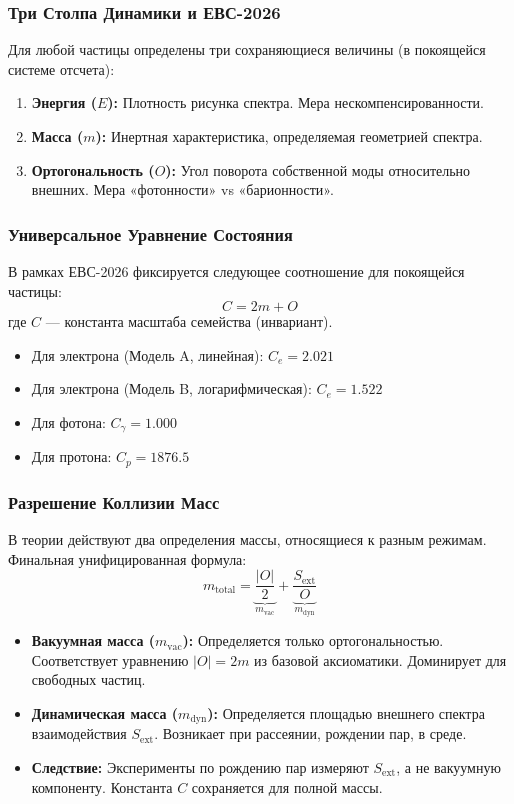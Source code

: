 \documentclass[12pt,a4paper]{article}
\begin{document}
\subsubsection{Три Столпа Динамики и ЕВС-2026}
Для любой частицы определены три сохраняющиеся величины (в покоящейся системе отсчета):
\begin{enumerate}
    \item \textbf{Энергия ($E$):} Плотность рисунка спектра. Мера нескомпенсированности.
    \item \textbf{Масса ($m$):} Инертная характеристика, определяемая геометрией спектра.
    \item \textbf{Ортогональность ($O$):} Угол поворота собственной моды относительно внешних. Мера «фотонности» vs «барионности».
\end{enumerate}

\subsubsection{Универсальное Уравнение Состояния}
В рамках ЕВС-2026 фиксируется следующее соотношение для покоящейся частицы:
\begin{equation}
    C = 2m + O
\end{equation}
где $C$ — константа масштаба семейства (инвариант).
\begin{itemize}
    \item Для электрона (Модель A, линейная): $C_e = 2.021$
    \item Для электрона (Модель B, логарифмическая): $C_e = 1.522$
    \item Для фотона: $C_\gamma = 1.000$
    \item Для протона: $C_p = 1876.5$
\end{itemize}

\subsubsection{Разрешение Коллизии Масс}
В теории действуют два определения массы, относящиеся к разным режимам. Финальная унифицированная формула:
\begin{equation}
    m_{\text{total}} = \underbrace{\frac{|O|}{2}}_{m_{\text{vac}}} + \underbrace{\frac{S_{\text{ext}}}{O}}_{m_{\text{dyn}}}
\end{equation}
\begin{itemize}
    \item \textbf{Вакуумная масса ($m_{\text{vac}}$):} Определяется только ортогональностью. Соответствует уравнению $|O|=2m$ из базовой аксиоматики. Доминирует для свободных частиц.
    \item \textbf{Динамическая масса ($m_{\text{dyn}}$):} Определяется площадью внешнего спектра взаимодействия $S_{\text{ext}}$. Возникает при рассеянии, рождении пар, в среде.
    \item \textbf{Следствие:} Эксперименты по рождению пар измеряют $S_{\text{ext}}$, а не вакуумную компоненту. Константа $C$ сохраняется для полной массы.
\end{itemize}
\end{document}
